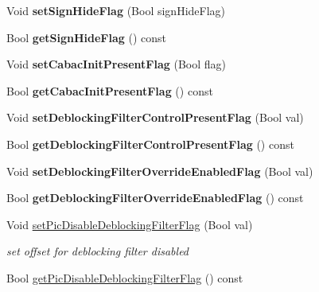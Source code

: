 \begin{DoxyCompactItemize}
Void {\bfseries set\+Sign\+Hide\+Flag} (Bool sign\+Hide\+Flag)
\item 
\mbox{\label{class_t_com_p_p_s_a181c7519cc5fee6aa67dd192d3170c78}} 
Bool {\bfseries get\+Sign\+Hide\+Flag} () const
\item 
\mbox{\label{class_t_com_p_p_s_a6da736a41b8bf1d866e0b0187c6af563}} 
Void {\bfseries set\+Cabac\+Init\+Present\+Flag} (Bool flag)
\item 
\mbox{\label{class_t_com_p_p_s_ad5949cd56cf5fa4134b30320965d092e}} 
Bool {\bfseries get\+Cabac\+Init\+Present\+Flag} () const
\item 
\mbox{\label{class_t_com_p_p_s_a6af5a40e259337af87ccf8d078727c8d}} 
Void {\bfseries set\+Deblocking\+Filter\+Control\+Present\+Flag} (Bool val)
\item 
\mbox{\label{class_t_com_p_p_s_acd90e3a52a1cd5493b640e9e7f369f58}} 
Bool {\bfseries get\+Deblocking\+Filter\+Control\+Present\+Flag} () const
\item 
\mbox{\label{class_t_com_p_p_s_ae81a21f0c6fc00904d0c5ad434b19b52}} 
Void {\bfseries set\+Deblocking\+Filter\+Override\+Enabled\+Flag} (Bool val)
\item 
\mbox{\label{class_t_com_p_p_s_a0b7954455acf6171c5036caf78d74df9}} 
Bool {\bfseries get\+Deblocking\+Filter\+Override\+Enabled\+Flag} () const
\item 
\mbox{\label{class_t_com_p_p_s_a0f858cf3b0ade9d9faaae41446d8f64e}} 
Void \hyperlink{class_t_com_p_p_s_a0f858cf3b0ade9d9faaae41446d8f64e}{set\+Pic\+Disable\+Deblocking\+Filter\+Flag} (Bool val)
\begin{DoxyCompactList}\small\item\em set offset for deblocking filter disabled \end{DoxyCompactList}\item 
\mbox{\label{class_t_com_p_p_s_a5e028a65423881f97ef243b0fb0e4b00}} 
Bool \hyperlink{class_t_com_p_p_s_a5e028a65423881f97ef243b0fb0e4b00}{get\+Pic\+Disable\+Deblocking\+Filter\+Flag} () const

\end{DoxyCompactItemize}

